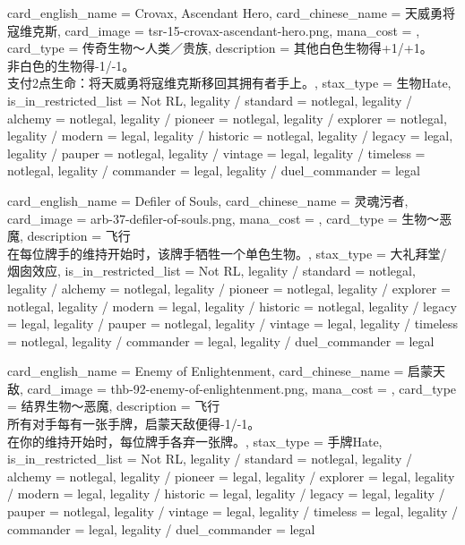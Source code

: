\documentclass[lang = cn, color = black, 10pt]{AllThatStax}
\begin{document}
\card
{
	card_english_name = {Crovax, Ascendant Hero},
	card_chinese_name = {天威勇将寇维克斯},
	card_image = tsr-15-crovax-ascendant-hero.png,
	mana_cost = ,
	card_type = 传奇生物～人类／贵族,
	description = {其他白色生物得+1/+1。\\
非白色的生物得-1/-1。\\
支付2点生命：将天威勇将寇维克斯移回其拥有者手上。},
	stax_type = 生物Hate,
	is_in_restricted_list = Not RL,
	legality / standard = notlegal,
	legality / alchemy = notlegal,
	legality / pioneer = notlegal,
	legality / explorer = notlegal,
	legality / modern = legal,
	legality / historic = notlegal,
	legality / legacy = legal,
	legality / pauper = notlegal,
	legality / vintage = legal,
	legality / timeless = notlegal,
	legality / commander = legal,
	legality / duel_commander = legal
}

\card
{
	card_english_name = {Defiler of Souls},
	card_chinese_name = {灵魂污者},
	card_image = arb-37-defiler-of-souls.png,
	mana_cost = ,
	card_type = 生物～恶魔,
	description = {飞行\\
在每位牌手的维持开始时，该牌手牺牲一个单色生物。},
	stax_type = 大礼拜堂/烟囱效应,
	is_in_restricted_list = Not RL,
	legality / standard = notlegal,
	legality / alchemy = notlegal,
	legality / pioneer = notlegal,
	legality / explorer = notlegal,
	legality / modern = legal,
	legality / historic = notlegal,
	legality / legacy = legal,
	legality / pauper = notlegal,
	legality / vintage = legal,
	legality / timeless = notlegal,
	legality / commander = legal,
	legality / duel_commander = legal
}

\card
{
	card_english_name = {Enemy of Enlightenment},
	card_chinese_name = {启蒙天敌},
	card_image = thb-92-enemy-of-enlightenment.png,
	mana_cost = ,
	card_type = 结界生物～恶魔,
	description = {飞行\\
所有对手每有一张手牌，启蒙天敌便得-1/-1。\\
在你的维持开始时，每位牌手各弃一张牌。},
	stax_type = 手牌Hate,
	is_in_restricted_list = Not RL,
	legality / standard = notlegal,
	legality / alchemy = notlegal,
	legality / pioneer = legal,
	legality / explorer = legal,
	legality / modern = legal,
	legality / historic = legal,
	legality / legacy = legal,
	legality / pauper = notlegal,
	legality / vintage = legal,
	legality / timeless = legal,
	legality / commander = legal,
	legality / duel_commander = legal
}
\end{document}
